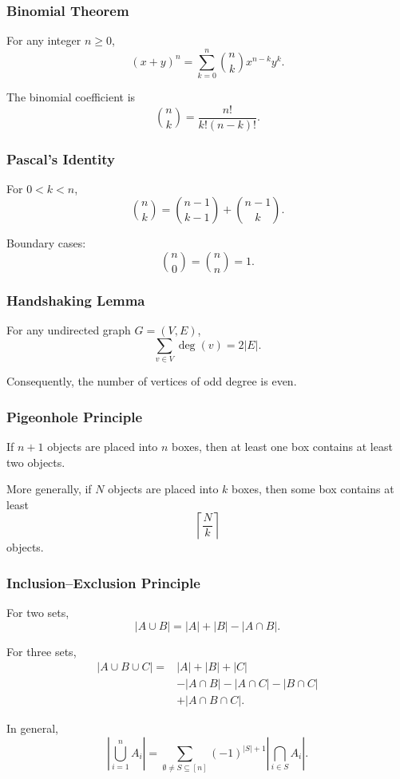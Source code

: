 \documentclass[11pt]{article}
\begin{document}
\subsubsection{Binomial Theorem}

For any integer $n\geq 0$,
\[
(x+y)^n
=
\sum_{k=0}^{n}
\binom{n}{k}x^{n-k}y^k.
\]

The binomial coefficient is
\[
\binom{n}{k}
=
\frac{n!}{k!(n-k)!}.
\]

\subsubsection{Pascal's Identity}

For $0<k<n$,
\[
\binom{n}{k}
=
\binom{n-1}{k-1}
+
\binom{n-1}{k}.
\]

Boundary cases:
\[
\binom{n}{0}=\binom{n}{n}=1.
\]

\subsubsection{Handshaking Lemma}

For any undirected graph $G=(V,E)$,
\[
\sum_{v\in V}\deg(v)=2|E|.
\]

Consequently, the number of vertices of odd degree is even.

\subsubsection{Pigeonhole Principle}

If $n+1$ objects are placed into $n$ boxes, then at least one box contains at least two objects.

More generally, if $N$ objects are placed into $k$ boxes, then some box contains at least
\[
\left\lceil\frac Nk\right\rceil
\]
objects.

\subsubsection{Inclusion--Exclusion Principle}

For two sets,
\[
|A\cup B|
=
|A|+|B|-|A\cap B|.
\]

For three sets,
\[
\begin{aligned}
|A\cup B\cup C|
={}&|A|+|B|+|C|\\
&-|A\cap B|-|A\cap C|-|B\cap C|\\
&+|A\cap B\cap C|.
\end{aligned}
\]

In general,
\[
\left|\bigcup_{i=1}^n A_i\right|
=
\sum_{\emptyset\neq S\subseteq[n]}
(-1)^{|S|+1}
\left|\bigcap_{i\in S}A_i\right|.
\]
\end{document}

